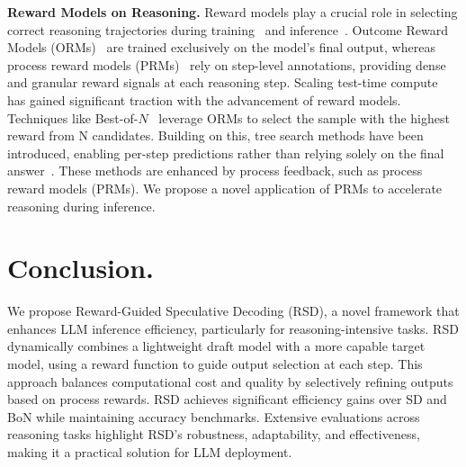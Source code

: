 \documentclass{article}
\theoremstyle{plain}
\theoremstyle{definition}
\theoremstyle{remark}
\begin{document}
\textbf{Reward Models on Reasoning.} Reward models play a crucial role in selecting correct reasoning trajectories during training~\citep{chen2024alphamath,wang2024math,zhou2025q} and inference~\citep{brown2024large}. Outcome Reward Models (ORMs)~\citep{yu2023outcome,dong2024rlhf} are trained exclusively on the model's final output, whereas process reward models (PRMs)~\citep{lightman2023let} rely on step-level annotations, providing dense and granular reward signals at each reasoning step. Scaling test-time compute~\citep{snell2024scaling,openai2024o1} has gained significant traction with the advancement of reward models. Techniques like Best-of-$N$~\citep{brown2024large,cobbe2021best,dong2023raft} leverage ORMs to select the sample with the highest reward from N candidates. Building on this, tree search methods have been introduced, enabling per-step predictions rather than relying solely on the final answer~\cite{chen2024alphamath,qi2024mutual,yao2024tree}. These methods are enhanced by process feedback, such as process reward models (PRMs). We propose a novel application of PRMs to accelerate reasoning during inference.


\section{Conclusion.} 
We propose Reward-Guided Speculative Decoding (RSD), a novel framework that enhances LLM inference efficiency, particularly for reasoning-intensive tasks. RSD dynamically combines a lightweight draft model with a more capable target model, using a reward function to guide output selection at each step. This approach balances computational cost and quality by selectively refining outputs based on process rewards. 
RSD achieves significant efficiency gains over SD and BoN while maintaining accuracy benchmarks. Extensive evaluations across reasoning tasks highlight RSD's robustness, adaptability, and effectiveness, making it a practical solution for LLM deployment.
\end{document}
